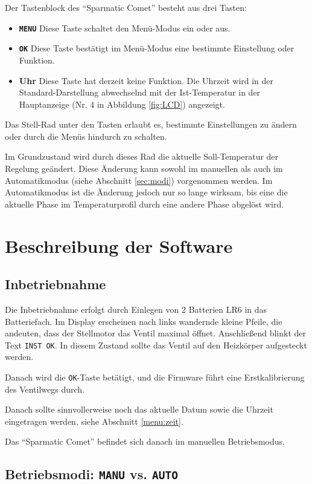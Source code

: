 \documentclass[a4paper]{article}
\newcommand\SC{"`Sparmatic Comet"' }
\begin{document}
Der Tastenblock des \SC besteht aus drei Tasten:

\begin{itemize}
\item \textbf{\texttt{MENU}} Diese Taste schaltet den Menü-Modus ein oder aus.
\item \textbf{\texttt{OK}} Diese Taste bestätigt im Menü-Modus eine bestimmte
  Einstellung oder Funktion.
\item \textbf{Uhr} Diese Taste hat derzeit keine Funktion.  Die Uhrzeit wird
  in der Standard-Darstellung abwechselnd mit der Ist-Temperatur in der
  Hauptanzeige (Nr. 4 in Abbildung \ref{fig:LCD}) angezeigt.
\end{itemize}

Das Stell-Rad unter den Tasten erlaubt es, bestimmte Einstellungen zu
ändern oder durch die Menüs hindurch zu schalten.

Im Grundzustand wird durch dieses Rad die aktuelle Soll-Temperatur
der Regelung geändert.  Diese Änderung kann sowohl im manuellen als
auch im Automatikmodus (siehe Abschnitt \ref{sec:modi}) vorgenommen
werden.  Im Automatikmodus ist die Änderung jedoch nur so lange
wirksam, bis eine die aktuelle Phase im Temperaturprofil durch eine
andere Phase abgelöst wird.

\section {
  Beschreibung der Software
}

\subsection {
  Inbetriebnahme
}

Die Inbetriebnahme erfolgt durch Einlegen von 2 Batterien LR6 in das
Batteriefach.  Im Display erscheinen nach links wandernde kleine
Pfeile, die andeuten, dass der Stellmotor das Ventil maximal öffnet.
Anschließend blinkt der Text \texttt{INST OK}.  In diesem Zustand sollte
das Ventil auf den Heizkörper aufgesteckt werden.

Danach wird die \texttt{OK}-Taste betätigt, und die Firmware führt eine
Erstkalibrierung des Ventilwegs durch.

Danach sollte sinnvollerweise noch das aktuelle Datum sowie die
Uhrzeit eingetragen werden, siehe Abschnitt \ref{menu:zeit}.

Das \SC befindet sich danach im manuellen Betriebsmodus.

\subsection {
  Betriebsmodi: \texttt{MANU} vs. \texttt{AUTO}\label{sec:modi}
}
\end{document}
